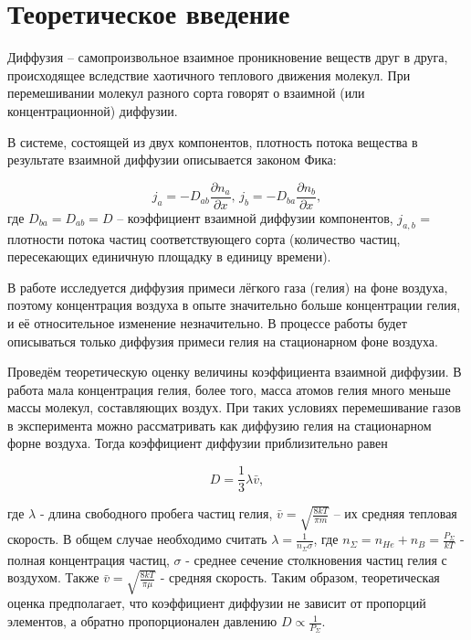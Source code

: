 \documentclass[a4paper, 12pt]{article} %
\begin{document}
\section{Теоретическое введение}

Диффузия -- самопроизвольное взаимное проникновение веществ друг в друга, происходящее вследствие хаотичного теплового движения молекул. При перемешивании молекул разного сорта говорят о взаимной (или концентрационной) диффузии.

В системе, состоящей из двух компонентов, плотность потока вещества в результате взаимной диффузии описывается законом Фика:

\begin{equation}
	j_a = -D_{ab} \frac{\partial n_a}{\partial x} \text{, }j_b = -D_{ba} \frac{\partial n_b}{\partial x},
\end{equation}
где $D_{ba} = D_{ab} = D$ -- коэффициент взаимной диффузии компонентов, $j_{a,b}$ = плотности потока частиц соответствующего сорта (количество частиц, пересекающих единичную площадку в единицу времени).


В работе исследуется диффузия примеси лёгкого газа (гелия) на фоне воздуха, поэтому концентрация воздуха в опыте значительно больше концентрации гелия, и её относительное изменение незначительно. В процессе работы будет описываться только диффузия примеси гелия на стационарном фоне воздуха.

Проведём теоретическую оценку величины коэффициента взаимной диффузии. В работа мала концентрация гелия, более того, масса атомов гелия много меньше массы молекул, составляющих воздух. При таких условиях перемешивание газов в эксперимента можно рассматривать как диффузию гелия на стационарном форне воздуха. Тогда коэффициент диффузии приблизительно равен

\begin{equation}
	D = \frac{1}{3}\lambda \bar v,
\end{equation}

где $\lambda$ - длина свободного пробега частиц гелия, $\bar v = \sqrt{\frac{8kT}{\pi m}}$ -- их средняя тепловая скорость. В общем случае необходимо считать $\lambda = \frac{1}{n_\Sigma \sigma}$, где $n_\Sigma = n_{He} + n_B = \frac{P_\Sigma}{kT}$ - полная концентрация частиц, $\sigma$ -  среднее сечение столкновения частиц гелия с воздухом. Также  $\bar v = \sqrt{\frac{8kT}{\pi \mu}}$ - средняя скорость. Таким образом, теоретическая оценка предполагает, что коэффициент диффузии не зависит от пропорций элементов, а обратно пропорционален давлению $D \propto \frac{1}{P_\Sigma}$.
\end{document}

